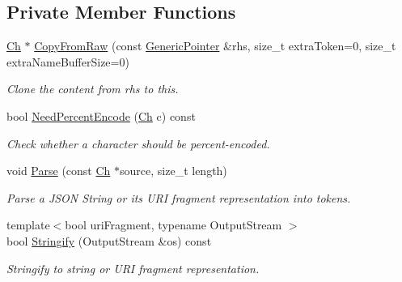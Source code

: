 \subsection*{Private Member Functions}
\begin{DoxyCompactItemize}
\item 
\hyperlink{class_generic_pointer_a38b73c84d37428340066d907f9d4f37f}{Ch} $\ast$ \hyperlink{class_generic_pointer_af6708500dbbfd4a01b0fa291ca487e1d}{Copy\+From\+Raw} (const \hyperlink{class_generic_pointer}{Generic\+Pointer} \&rhs, size\+\_\+t extra\+Token=0, size\+\_\+t extra\+Name\+Buffer\+Size=0)
\begin{DoxyCompactList}\small\item\em Clone the content from rhs to this. \end{DoxyCompactList}\item 
bool \hyperlink{class_generic_pointer_ab7dc9f4a09830b4c19083608e25ef0a9}{Need\+Percent\+Encode} (\hyperlink{class_generic_pointer_a38b73c84d37428340066d907f9d4f37f}{Ch} c) const 
\begin{DoxyCompactList}\small\item\em Check whether a character should be percent-\/encoded. \end{DoxyCompactList}\item 
void \hyperlink{class_generic_pointer_a542a313d11b2296c92420179b9e9cf87}{Parse} (const \hyperlink{class_generic_pointer_a38b73c84d37428340066d907f9d4f37f}{Ch} $\ast$source, size\+\_\+t length)
\begin{DoxyCompactList}\small\item\em Parse a J\+S\+ON String or its U\+RI fragment representation into tokens. \end{DoxyCompactList}\item 
{\footnotesize template$<$bool uri\+Fragment, typename Output\+Stream $>$ }\\bool \hyperlink{class_generic_pointer_ae3d83647990a335bab478afc84737b63}{Stringify} (Output\+Stream \&os) const 
\begin{DoxyCompactList}\small\item\em Stringify to string or U\+RI fragment representation. \end{DoxyCompactList}\end{DoxyCompactItemize}
